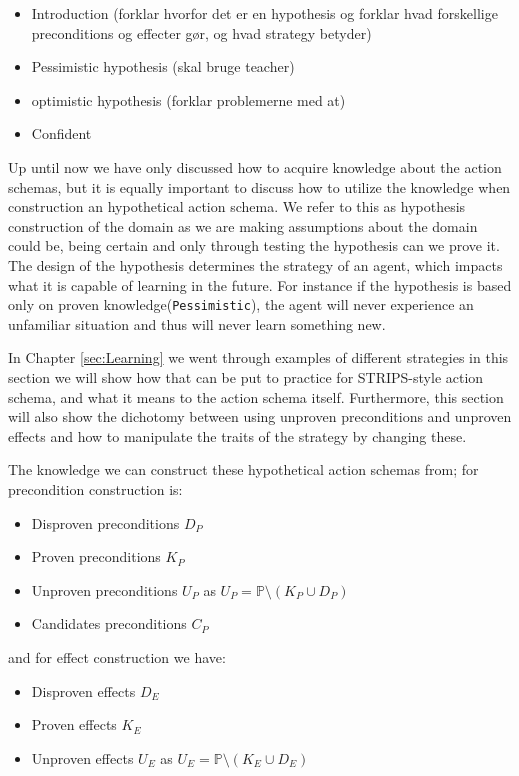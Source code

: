 \documentclass[../Master.tex]{subfiles}
\begin{document}
\begin{itemize}
	\item Introduction (forklar hvorfor det er en hypothesis og forklar hvad forskellige preconditions og effecter gør, og hvad strategy betyder)
	\item Pessimistic hypothesis (skal bruge teacher)
	\item optimistic hypothesis (forklar problemerne med at)		
	\item Confident
\end{itemize}
	
	Up until now we have only discussed how to acquire knowledge about the action schemas, but it is equally important to discuss how to utilize the knowledge when construction an hypothetical action schema.
	We refer to this as hypothesis construction of the domain as we are making assumptions about the domain could be, being certain and only through testing the hypothesis can we prove it.
	The design of the hypothesis determines the strategy of an agent, which impacts what it is capable of learning in the future. 
	For instance if the hypothesis is based only on proven knowledge(\texttt{Pessimistic}), the agent will never experience an unfamiliar situation and thus will never learn something new.
	
	In Chapter \ref{sec:Learning} we went through examples of different strategies in this section we will show how that can be put to practice for STRIPS-style action schema, and what it means to the action schema itself.
	Furthermore, this section will also show the dichotomy between using unproven preconditions and unproven effects and how to manipulate the traits of the strategy by changing these.
	
	The knowledge we can construct these hypothetical action schemas from; for precondition construction is:
	
	\begin{itemize}		
		\item Disproven preconditions $D_P$
		\item Proven preconditions $K_P$
		\item Unproven preconditions $U_P$ as $U_P = \mathbb{P} \setminus (K_P \cup D_P)$
		\item Candidates preconditions $C_P$
	\end{itemize}

	and for effect construction we have:
	
	\begin{itemize}		
		\item Disproven effects $D_E$
		\item Proven effects $K_E$
		\item Unproven effects $U_E$ as $U_E = \mathbb{P} \setminus (K_E \cup D_E)$
	\end{itemize}
	
\end{document}
